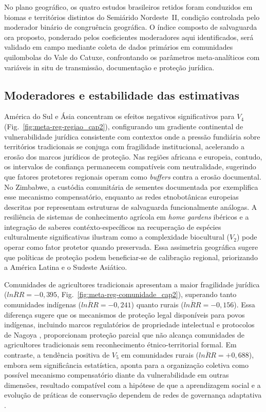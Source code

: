 No plano geográfico, os quatro estudos brasileiros retidos \cite{Goncalves2022,Bastos2022,deSousa2024,Avila2021} foram conduzidos em biomas e territórios distintos do Semiárido Nordeste~II, condição controlada pelo moderador binário de congruência geográfica. O índice composto de salvaguarda ora proposto, ponderado pelos coeficientes moderadores aqui identificados, será validado em campo mediante coleta de dados primários em comunidades quilombolas do Vale do Catuxe, confrontando os parâmetros meta-analíticos com variáveis in situ de transmissão, documentação e proteção jurídica.

\subsection{Moderadores e estabilidade das estimativas}
\label{sec:moderadores-discussao_cap2}

América do Sul e Ásia concentram os efeitos negativos significativos para $V_4$ (Fig.~\ref{fig:meta-reg-regiao_cap2}), configurando um gradiente continental de vulnerabilidade jurídica consistente com contextos onde a pressão fundiária sobre territórios tradicionais se conjuga com fragilidade institucional, acelerando a erosão dos marcos jurídicos de proteção. Nas regiões africana e europeia, contudo, os intervalos de confiança permanecem compatíveis com neutralidade, sugerindo que fatores protetores regionais operam como \textit{buffers} contra a erosão documental. No Zimbabwe, a custódia comunitária de sementes documentada por  exemplifica esse mecanismo compensatório, enquanto as redes etnobotânicas europeias descritas por  representam estruturas de salvaguarda funcionalmente análogas. A resiliência de sistemas de conhecimento agrícola em \textit{home gardens} ibéricos \cite{ReyesGarcia2014} e a integração de saberes contéxto-específicos na recuperação de espécies culturalmente significativas \cite{Rayne2022} ilustram como a complexidade biocultural ($V_2$) pode operar como fator protetor quando preservada. Essa assimetria geográfica sugere que políticas de proteção podem beneficiar-se de calibração regional, priorizando a América Latina e o Sudeste Asiático.

Comunidades de agricultores tradicionais apresentam a maior fragilidade jurídica ($\overline{lnRR} = -0{,}395$, Fig.~\ref{fig:meta-reg-comunidade_cap2}), superando tanto comunidades indígenas ($\overline{lnRR} = -0{,}241$) quanto rurais ($\overline{lnRR} = -0{,}156$). Essa diferença sugere que os mecanismos de proteção legal disponíveis para povos indígenas, incluindo marcos regulatórios de propriedade intelectual e protocolos de Nagoya \cite{BavikatteRobinson2011,Robinson2014}, proporcionam proteção parcial que não alcança comunidades de agricultores tradicionais sem reconhecimento étnico-territorial formal. Em contraste, a tendência positiva de $V_5$ em comunidades rurais ($\overline{lnRR} = +0{,}688$), embora sem significância estatística, aponta para a organização coletiva como possível mecanismo compensatório diante da vulnerabilidade em outras dimensões, resultado compatível com a hipótese de que a aprendizagem social e a evolução de práticas de conservação dependem de redes de governança adaptativa \cite{BerkesTurner2006,Folke2004}.

